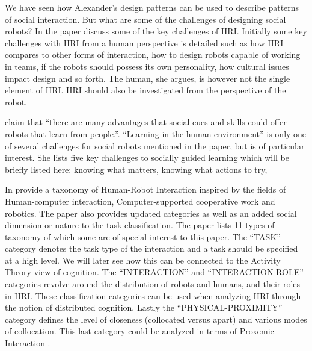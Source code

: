 We have seen how Alexander's design patterns can be used to describe patterns of social interaction. But what are some of the challenges of designing social robots? In the paper  \textcite{Breazeal2004robot} discuss some of the key challenges of HRI. Initially some key challenges with HRI from a human perspective is detailed such as how HRI compares to other forms of interaction, how to design robots capable of working in teams, if the robots should possess its own personality, how cultural issues impact design and so forth. The human, she argues, is however not the single element of HRI. HRI should also be investigated from the perspective of the robot.

\textcite[][184]{Breazeal2004robot} claim that ``there are many advantages that social cues and skills could offer robots that learn from people.''. ``Learning in the human environment'' is only one of several challenges for social robots mentioned in the paper, but is of particular interest. She lists five key challenges to socially guided learning which will be briefly listed here: knowing what matters, knowing what actions to try, 

In  \textcite{Yanco2004robot} provide a taxonomy of Human-Robot Interaction inspired by the fields of Human-computer interaction, Computer-supported cooperative work and robotics. The paper also provides updated categories as well as an added social dimension or nature to the task classification. The paper lists 11 types of taxonomy of which some are of special interest to this paper. The ``TASK'' category denotes the task type of the interaction and a task should be specified at a high level. We will later see how this can be connected to the Activity Theory view of cognition. The ``INTERACTION'' and ``INTERACTION-ROLE'' categories revolve around the distribution of robots and humans, and their roles in HRI. These classification categories can be used when analyzing HRI through the notion of distributed cognition. Lastly the ``PHYSICAL-PROXIMITY'' category defines the level of closeness (collocated versus apart) and various modes of collocation. This last category could be analyzed in terms of Proxemic Interaction \parencite{Yanco2004robot}.